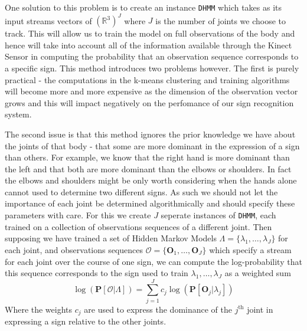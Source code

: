 One solution to this problem is to create an instance \verb|DHMM| which takes as its input streams vectors of $(\mathbb{R}^3)^J$ where $J$ is the number of joints we choose to track. This will allow us to train the model on full observations of the body and hence will take into account all of the information available through the Kinect Sensor in computing the probability that an observation sequence corresponds to a specific sign. This method introduces two problems however. The first is purely practical - the computations in the k-means clustering and training algorithms will become more and more expensive as the dimension of the observation vector grows and this will impact negatively on the perfomance of our sign recognition system.

The second issue is that this method ignores the prior knowledge we have about the joints of that body - that some are more dominant in the expression of a sign than others. For example, we know that the right hand is more dominant than the left and that both are more dominant than the elbows or shoulders. In fact the elbows and shoulders might be only worth considering when the hands alone cannot used to determine two different signs. As such we should not let the importance of each joint be determined algorithmically and should specify these parameters with care. For this we create $J$ seperate instances of \verb|DHMM|, each trained on a collection of observations sequences of a different joint. Then supposing we have trained a set of Hidden Markov Models $\Lambda = \{\lambda_1, \dots, \lambda_J\}$ for each joint, and observations sequences $\mathcal{O} = \{\mathbf{O}_1,\dots, \mathbf{O}_J\}$ which specify a stream for each joint over the course of one sign, we can compute the log-probability that this sequence corresponds to the sign used to train $\lambda_1, \dots, \lambda_J$ as a weighted sum
\begin{equation*}
\log(\mathbf{P}[\mathcal{O} | \Lambda ]) = \sum_{j=1}^{J} c_j \log(\mathbf{P}[\mathbf{O}_j | \lambda_j])
\end{equation*}
Where the weights $c_j$ are used to express the dominance of the $j^\text{th}$ joint in expressing a sign relative to the other joints.

